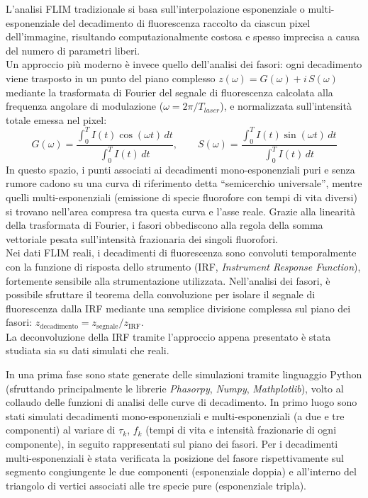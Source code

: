 \documentclass[a4paper, 11pt]{article}
\begin{document}
L'analisi FLIM tradizionale si basa sull'interpolazione esponenziale o multi-esponenziale del decadimento di fluorescenza raccolto da ciascun pixel dell'immagine, risultando computazionalmente costosa e spesso imprecisa a causa del numero di parametri liberi.\\
Un approccio più moderno è invece quello dell'analisi dei fasori: ogni decadimento viene trasposto in un punto del piano complesso $z(\omega) = G(\omega) + i\,S(\omega)$ mediante la trasformata di Fourier del segnale di fluorescenza calcolata alla frequenza angolare di modulazione ($\omega =2\pi/T_{laser}$), e normalizzata sull'intensità totale emessa nel pixel:
\[
G(\omega) = \frac{\int_0^{T} I(t) \cos(\omega t)\,dt}{\int_0^{T} I(t)\,dt}, \qquad 
S(\omega) = \frac{\int_0^{T} I(t) \sin(\omega t)\,dt}{\int_0^{T} I(t)\,dt}
\]
In questo spazio, i punti associati ai decadimenti mono-esponenziali puri e senza rumore cadono su una curva di riferimento detta ``semicerchio universale'', mentre quelli multi-esponenziali (emissione di specie fluorofore con tempi di vita diversi) si trovano nell'area compresa tra questa curva e l'asse reale. Grazie alla linearità della trasformata di Fourier, i fasori obbediscono alla regola della somma vettoriale pesata sull'intensità frazionaria dei singoli fluorofori.\\
Nei dati FLIM reali, i decadimenti di fluorescenza sono convoluti temporalmente con la funzione di risposta dello strumento (IRF, \textit{Instrument Response Function}), fortemente sensibile alla strumentazione utilizzata. Nell'analisi dei fasori, è possibile sfruttare il teorema della convoluzione per isolare il segnale di fluorescenza dalla IRF mediante una semplice divisione complessa sul piano dei fasori: $z_{\text{decadimento}} = z_{\text{segnale}}/z_{\text{IRF}}$.\\
La deconvoluzione della IRF tramite l'approccio appena presentato è stata studiata sia su dati simulati che reali.

In una prima fase sono state generate delle simulazioni tramite linguaggio Python (sfruttando principalmente le librerie \textit{Phasorpy}, \textit{Numpy}, \textit{Mathplotlib}), volto al collaudo delle funzioni di analisi delle curve di decadimento.
In primo luogo sono stati simulati decadimenti mono-esponenziali e multi-esponenziali (a due e tre componenti) al variare di $\tau_k$, $f_k$ (tempi di vita e intensità frazionarie di ogni componente), in seguito rappresentati sul piano dei fasori. Per i decadimenti multi-esponenziali è stata verificata la posizione del fasore rispettivamente sul segmento congiungente le due componenti (esponenziale doppia) e all'interno del triangolo di vertici associati alle tre specie pure (esponenziale tripla).
\end{document}
